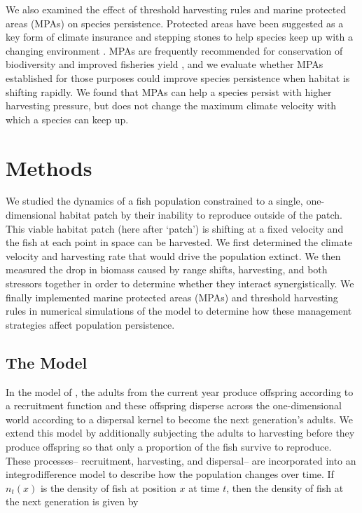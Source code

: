 \documentclass[12pt,english]{article}
\begin{document}
\begin{spacing}{1.9}
\begin{flushleft}
We also examined the effect of threshold harvesting rules and marine protected areas (MPAs) on species persistence. Protected areas have been suggested as a key form of climate insurance and stepping stones to help species keep up with a changing environment \citep{Thomasetal2012, Hannahetal2007}. MPAs are frequently recommended for conservation of biodiversity and improved fisheries yield \citep{Gainesetal2010}, and we evaluate whether MPAs established for those purposes could improve species persistence when habitat is shifting rapidly. We found that MPAs can help a species persist with higher harvesting pressure, but does not change the maximum climate velocity with which a species can keep up.

\section{Methods}

We studied the dynamics of a fish population constrained to a single, one-dimensional habitat patch by their inability to reproduce outside of the patch.  This viable habitat patch (here after `patch') is shifting at a fixed velocity and the fish at each point in space can be harvested.  We first determined the climate velocity and harvesting rate that would drive the population extinct.  We then measured the drop in biomass caused by range shifts, harvesting, and both stressors together in order to determine whether they interact synergistically.    We finally implemented marine protected areas (MPAs) and threshold harvesting rules in numerical simulations of the model to determine how these management strategies affect population persistence.

\subsection{The Model }

In the model of \cite{ZhouKot2011}, the adults from the current year produce offspring according to a recruitment function and these offspring disperse across the one-dimensional world according to a dispersal kernel to become the next generation's adults.  We extend this model by additionally subjecting the adults to harvesting before they produce offspring so that only a proportion of the fish survive to reproduce. These processes-- recruitment, harvesting, and dispersal-- are incorporated into an integrodifference model to describe how the population changes over time. If $n_t(x)$ 
is the density of fish at position $x$ at time $t$, then the density of fish at the next generation is given by


\end{flushleft}
\end{spacing}
\end{document}
